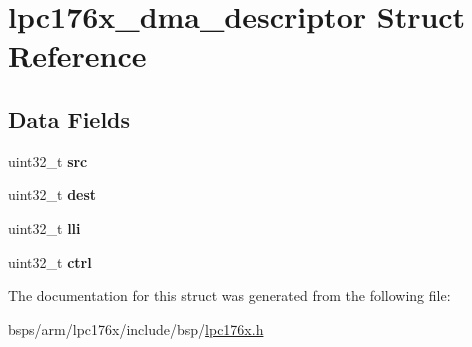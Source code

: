 \hypertarget{structlpc176x__dma__descriptor}{}\section{lpc176x\+\_\+dma\+\_\+descriptor Struct Reference}
\label{structlpc176x__dma__descriptor}
\subsection*{Data Fields}
\begin{DoxyCompactItemize}
\item 
\mbox{\label{structlpc176x__dma__descriptor_a4c4b5a5e900b6ac04c490dd1943441a7}} 
uint32\+\_\+t {\bfseries src}
\item 
\mbox{\label{structlpc176x__dma__descriptor_ad39a98cdeabdd5af11941337fabdb3fc}} 
uint32\+\_\+t {\bfseries dest}
\item 
\mbox{\label{structlpc176x__dma__descriptor_a5a54f263c9d28c17e34d90dc8dad5636}} 
uint32\+\_\+t {\bfseries lli}
\item 
\mbox{\label{structlpc176x__dma__descriptor_a9b24f4f029efb6dcef5bfa09eac15908}} 
uint32\+\_\+t {\bfseries ctrl}
\end{DoxyCompactItemize}


The documentation for this struct was generated from the following file\+:\begin{DoxyCompactItemize}
\item 
bsps/arm/lpc176x/include/bsp/\mbox{\hyperlink{lpc176x_8h}{lpc176x.\+h}}\end{DoxyCompactItemize}
